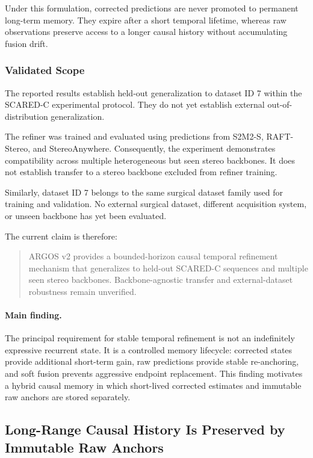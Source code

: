 \documentclass[11pt,a4paper]{article}
\begin{document}
Under this formulation, corrected predictions are never promoted to permanent long-term
memory. They expire after a short temporal lifetime, whereas raw observations preserve
access to a longer causal history without accumulating fusion drift.

\subsubsection{Validated Scope}

The reported results establish held-out generalization to dataset ID 7 within the
SCARED-C experimental protocol. They do not yet establish external out-of-distribution
generalization.

The refiner was trained and evaluated using predictions from S2M2-S, RAFT-Stereo, and
StereoAnywhere. Consequently, the experiment demonstrates compatibility across multiple
heterogeneous but seen stereo backbones. It does not establish transfer to a stereo
backbone excluded from refiner training.

Similarly, dataset ID 7 belongs to the same surgical dataset family used for training and
validation. No external surgical dataset, different acquisition system, or unseen
backbone has yet been evaluated.

The current claim is therefore:
\begin{quote}
ARGOS v2 provides a bounded-horizon causal temporal refinement mechanism that generalizes
to held-out SCARED-C sequences and multiple seen stereo backbones. Backbone-agnostic
transfer and external-dataset robustness remain unverified.
\end{quote}

\paragraph{Main finding.}

The principal requirement for stable temporal refinement is not an indefinitely expressive
recurrent state. It is a controlled memory lifecycle: corrected states provide additional
short-term gain, raw predictions provide stable re-anchoring, and soft fusion prevents
aggressive endpoint replacement. This finding motivates a hybrid causal memory in which
short-lived corrected estimates and immutable raw anchors are stored separately.

\subsection{Long-Range Causal History Is Preserved by Immutable Raw Anchors}
\label{sec:raw_anchor_memory}
\end{document}
